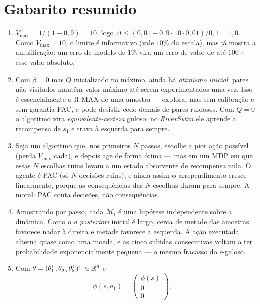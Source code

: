 \documentclass[11pt, a4paper]{article}
\newcommand{\Qtil}{\widetilde{Q}}
\newcommand{\Vmax}{V_{\max}}
\newcommand{\feat}{\phi}
\newcommand{\Mdp}{\mathcal{M}}
\newcommand{\Mtil}{\widetilde{\Mdp}}
\begin{document}
\section{Gabarito resumido}

\begin{enumerate}
  \item[\textbf{E1.}] $\Vmax = 1/(1-0{,}9) = 10$, logo
        $\Delta \le (0{,}01 + 0{,}9\cdot 10\cdot 0{,}01)/0{,}1 = 1{,}0$. Como
        $\Vmax = 10$, o limite é informativo (vale $10\%$ da escala), mas já mostra a
        amplificação: um erro de modelo de $1\%$ vira um erro de valor de até $100\times$
        esse valor absoluto.
  \item[\textbf{E2.}] Com $\beta = 0$ mas $\Qtil$ inicializado no máximo, ainda há
        \emph{otimismo inicial}: pares não visitados mantêm valor máximo até serem
        experimentados uma vez. Isso é essencialmente o R-MAX de uma amostra --- explora,
        mas sem calibração e sem garantia PAC, e pode desistir cedo demais de pares
        ruidosos. Com $\Qtil = 0$ o algoritmo vira \emph{equivalente-certeza} guloso:
        no \textit{RiverSwim} ele aprende a recompensa de $s_1$ e trava à esquerda para
        sempre.
  \item[\textbf{E3.}] Seja um algoritmo que, nos primeiros $N$ passos, escolhe a pior ação
        possível (perda $\Vmax$ cada), e depois age de forma ótima --- mas em um MDP em que
        essas $N$ escolhas ruins levam a um estado absorvente de recompensa nula. O agente
        é PAC (só $N$ decisões ruins), e ainda assim o arrependimento cresce linearmente,
        porque as consequências das $N$ escolhas duram para sempre. A moral: PAC conta
        decisões, não consequências.
  \item[\textbf{E4.}] Amostrando por passo, cada $\Mtil_t$ é uma hipótese independente
        sobre a dinâmica. Como o \textit{a posteriori} inicial é largo, cerca de metade
        das amostras favorece nadar à direita e metade favorece a esquerda. A ação
        executada alterna quase como uma moeda, e as cinco subidas consecutivas voltam a
        ter probabilidade exponencialmente pequena --- o mesmo fracasso do
        $\epsilon$-guloso.
  \item[\textbf{E5.}] Com $\theta = (\theta_1^{\!\top}, \theta_2^{\!\top},
        \theta_3^{\!\top})^{\!\top} \in \mathbb{R}^{6}$ e
        \[
          \feat(s,a_1) = \begin{pmatrix}\feat(s)\\ 0 \\ 0\end{pmatrix},\quad
\]
\end{enumerate}
\end{document}
